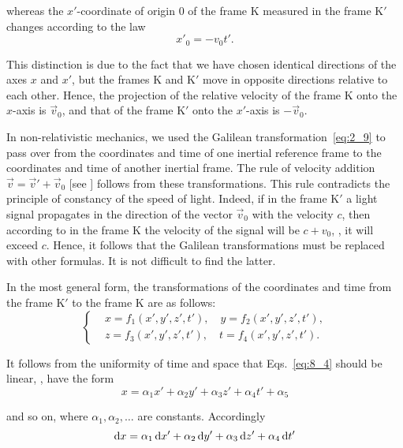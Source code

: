 \noindent
whereas the $x'$-coordinate of origin $0$ of the frame K measured in the frame K$'$ changes according to the law
\begin{equation}\label{eq:8_3}
	x'_0 = - v_0 t'.
\end{equation}

\noindent
This distinction is due to the fact that we have chosen identical directions of the axes $x$ and $x'$, but the frames K and K$'$ move in opposite directions relative to each other. Hence, the projection of the relative velocity of the frame K onto the $x$-axis is $\vec{v}_0$, and that of the frame K$'$ onto the $x'$-axis is $-\vec{v}_0$.

In non-relativistic mechanics, we used the Galilean transformation~\eqref{eq:2_9} to pass over from the coordinates and time of one inertial reference frame to the coordinates and time of another inertial frame. The rule of velocity addition $\vec{v}=\vec{v}'+\vec{v}_0$ [see ] follows from these transformations. This rule contradicts the principle of constancy of the speed of light. Indeed, if in the frame K$'$ a light signal propagates in the direction of the vector $\vec{v}_0$ with the velocity $c$, then according to  in the frame K the velocity of the signal will be $c+v_0$, \ie, it will exceed $c$. Hence, it follows that the Galilean transformations must be replaced with other formulas. It is not difficult to find the latter.

In the most general form, the transformations of the coordinates and time from the frame K$'$ to the frame K are as follows:
\begin{equation}\label{eq:8_4}
	\begin{cases}
		&\!\!\!\! x = f_1(x',y',z',t'),\quad y = f_2(x',y',z',t'),\\
		&\!\!\!\! z = f_3(x',y',z',t'),\quad t = f_4(x',y',z',t').
	\end{cases}
\end{equation}

\noindent
It follows from the uniformity of time and space that Eqs.~\eqref{eq:8_4} should be linear, \ie, have the form
\begin{equation}\label{eq:8_5}
	x = \alpha_1 x' + \alpha_2 y' + \alpha_3 z' + \alpha_4 t' + \alpha_5
\end{equation}

\noindent
and so on, where $\alpha_1, \alpha_2, \ldots$ are constants. Accordingly
\begin{equation}\label{eq:8_6}
	\mathrm{d} x = \alpha_1\,\mathrm{d} x' + \alpha_2\,\mathrm{d} y' + \alpha_3\,\mathrm{d} z' + \alpha_4\,\mathrm{d} t'
\end{equation}

